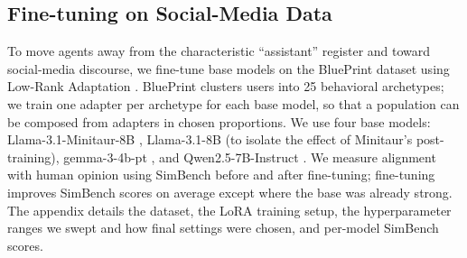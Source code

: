 \documentclass[letterpaper]{article} %
\begin{document}

\subsection{Fine-tuning on Social-Media Data}
To move agents away from the characteristic ``assistant'' register and toward social-media discourse, we fine-tune base models on the BluePrint dataset \citep{bückkaeffer2025textttblueprintsocialmediauser} using Low-Rank Adaptation \citep{hu2021loralowrankadaptationlarge}. BluePrint clusters users into 25 behavioral archetypes; we train one adapter per archetype for each base model, so that a population can be composed from adapters in chosen proportions. We use four base models: Llama-3.1-Minitaur-8B \citep{binz2024centaurfoundationmodelhuman}, Llama-3.1-8B (to isolate the effect of Minitaur's post-training), gemma-3-4b-pt \citep{gemma_2025}, and Qwen2.5-7B-Instruct \citep{qwen2}. We measure alignment with human opinion using SimBench \citep{hu2025simbenchbenchmarkingabilitylarge} before and after fine-tuning; fine-tuning improves SimBench scores on average except where the base was already strong. The appendix details the dataset, the LoRA training setup, the hyperparameter ranges we swept and how final settings were chosen, and per-model SimBench scores.
\end{document}
